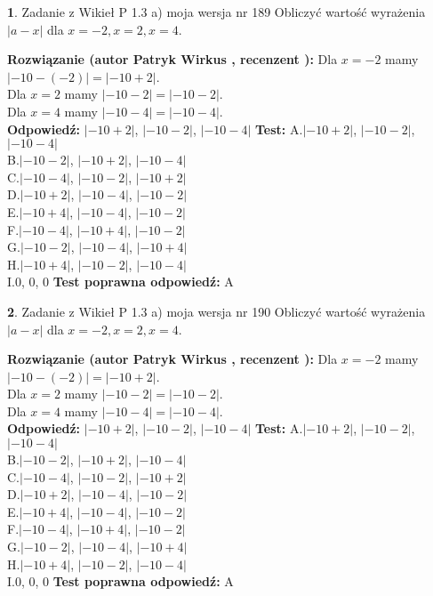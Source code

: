 \documentclass[12pt, a4paper]{article}
\theoremstyle{definition} %
\newtheorem{zad}{}
\newcommand{\zadStart}[1]{\begin{zad}#1\newline}
\newcommand{\zadStop}{\end{zad}}
\newcommand{\rozwStart}[2]{\noindent \textbf{Rozwiązanie (autor #1 , recenzent #2): }\newline}
\newcommand{\rozwStop}{\newline}
\newcommand{\odpStart}{\noindent \textbf{Odpowiedź:}\newline}
\newcommand{\odpStop}{\newline}
\newcommand{\testStart}{\noindent \textbf{Test:}\newline}
\newcommand{\testStop}{\newline}
\newcommand{\kluczStart}{\noindent \textbf{Test poprawna odpowiedź:}\newline}
\newcommand{\kluczStop}{\newline}
\begin{document}
\zadStart{Zadanie z Wikieł P 1.3 a) moja wersja nr 189}
Obliczyć wartość wyrażenia $|a - x|$ dla $x=-2,x=2,x=4$.
\zadStop
\rozwStart{Patryk Wirkus}{}
Dla $x = -2$ mamy $|-10 - (-2)| = |-10 + 2|$.\\
Dla $x = 2$ mamy $|-10 - 2| = |-10 - 2|$.\\
Dla $x = 4$ mamy $|-10 - 4| = |-10 - 4|$.\\
\rozwStop
\odpStart
$|-10 + 2|$, $|-10 - 2|$, $|-10 - 4|$
\odpStop
\testStart
A.$|-10 + 2|$, $|-10 - 2|$, $|-10 - 4|$\\
B.$|-10 - 2|$, $|-10 + 2|$, $|-10 - 4|$\\
C.$|-10 - 4|$, $|-10 - 2|$, $|-10 + 2|$\\
D.$|-10 + 2|$, $|-10 - 4|$, $|-10 - 2|$\\
E.$|-10 + 4|$, $|-10 - 4|$, $|-10 - 2|$\\
F.$|-10 - 4|$, $|-10 + 4|$, $|-10 - 2|$\\
G.$|-10 - 2|$, $|-10 - 4|$, $|-10 + 4|$\\
H.$|-10 + 4|$, $|-10 - 2|$, $|-10 - 4|$\\
I.$0$, $0$, $0$
\testStop
\kluczStart
A
\kluczStop



\zadStart{Zadanie z Wikieł P 1.3 a) moja wersja nr 190}
Obliczyć wartość wyrażenia $|a - x|$ dla $x=-2,x=2,x=4$.
\zadStop
\rozwStart{Patryk Wirkus}{}
Dla $x = -2$ mamy $|-10 - (-2)| = |-10 + 2|$.\\
Dla $x = 2$ mamy $|-10 - 2| = |-10 - 2|$.\\
Dla $x = 4$ mamy $|-10 - 4| = |-10 - 4|$.\\
\rozwStop
\odpStart
$|-10 + 2|$, $|-10 - 2|$, $|-10 - 4|$
\odpStop
\testStart
A.$|-10 + 2|$, $|-10 - 2|$, $|-10 - 4|$\\
B.$|-10 - 2|$, $|-10 + 2|$, $|-10 - 4|$\\
C.$|-10 - 4|$, $|-10 - 2|$, $|-10 + 2|$\\
D.$|-10 + 2|$, $|-10 - 4|$, $|-10 - 2|$\\
E.$|-10 + 4|$, $|-10 - 4|$, $|-10 - 2|$\\
F.$|-10 - 4|$, $|-10 + 4|$, $|-10 - 2|$\\
G.$|-10 - 2|$, $|-10 - 4|$, $|-10 + 4|$\\
H.$|-10 + 4|$, $|-10 - 2|$, $|-10 - 4|$\\
I.$0$, $0$, $0$
\testStop
\kluczStart
A
\kluczStop
\end{document}
